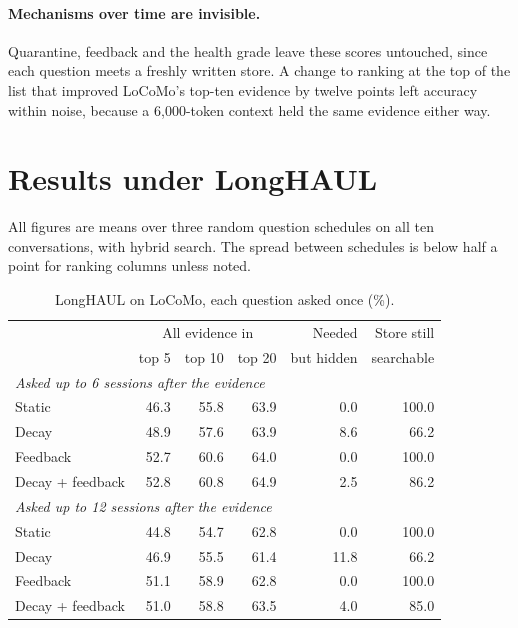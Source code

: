 \documentclass[11pt]{article}
\begin{document}
\paragraph{Mechanisms over time are invisible.} Quarantine, feedback
and the health grade leave these scores untouched, since each question
meets a freshly written store. A change to ranking at the top of the
list that improved LoCoMo's top-ten evidence by twelve points left
accuracy within noise, because a 6{,}000-token context held the same
evidence either way.

\section{Results under LongHAUL}
\label{sec:results}

All figures are means over three random question schedules on all ten
conversations, with hybrid search. The spread between schedules is
below half a point for ranking columns unless noted.

\begin{table}[t]
\centering
\small
\begin{tabular}{lrrrrr}
\toprule
 & \multicolumn{3}{c}{All evidence in} & Needed & Store still \\
 & top 5 & top 10 & top 20 & but hidden & searchable \\
\midrule
\multicolumn{6}{l}{\emph{Asked up to 6 sessions after the evidence}} \\
Static & 46.3 & 55.8 & 63.9 & 0.0 & 100.0 \\
Decay & 48.9 & 57.6 & 63.9 & 8.6 & 66.2 \\
Feedback & 52.7 & 60.6 & 64.0 & 0.0 & 100.0 \\
Decay + feedback & 52.8 & 60.8 & 64.9 & 2.5 & 86.2 \\
\midrule
\multicolumn{6}{l}{\emph{Asked up to 12 sessions after the evidence}} \\
Static & 44.8 & 54.7 & 62.8 & 0.0 & 100.0 \\
Decay & 46.9 & 55.5 & 61.4 & 11.8 & 66.2 \\
Feedback & 51.1 & 58.9 & 62.8 & 0.0 & 100.0 \\
Decay + feedback & 51.0 & 58.8 & 63.5 & 4.0 & 85.0 \\
\bottomrule
\end{tabular}
\caption{LongHAUL on LoCoMo, each question asked once (\%).}
\label{tab:once}
\end{table}
\end{document}

